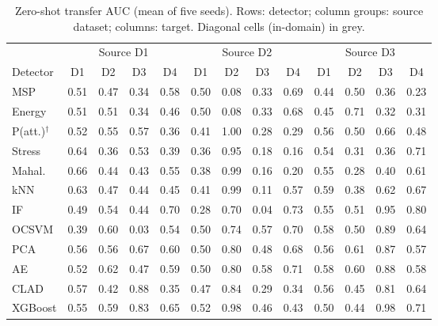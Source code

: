 \begin{table}[!t]
\centering
\scriptsize
\setlength{\tabcolsep}{3pt}
\caption{Zero-shot transfer AUC (mean of five seeds). Rows: detector; column groups: source dataset; columns: target. Diagonal cells (in-domain) in grey.}
\label{tab:a_transfer}
\begin{tabular}{lcccccccccccc}
\toprule
 & \multicolumn{4}{c}{Source D1} & \multicolumn{4}{c}{Source D2} & \multicolumn{4}{c}{Source D3}\\
\cmidrule(lr){2-5}\cmidrule(lr){6-9}\cmidrule(lr){10-13}
Detector & D1 & D2 & D3 & D4 & D1 & D2 & D3 & D4 & D1 & D2 & D3 & D4\\
\midrule
MSP & \cellcolor{black!10}0.51 & 0.47 & 0.34 & 0.58 & 0.50 & \cellcolor{black!10}0.08 & 0.33 & 0.69 & 0.44 & 0.50 & \cellcolor{black!10}0.36 & 0.23\\
Energy & \cellcolor{black!10}0.51 & 0.51 & 0.34 & 0.46 & 0.50 & \cellcolor{black!10}0.08 & 0.33 & 0.68 & 0.45 & 0.71 & \cellcolor{black!10}0.32 & 0.31\\
P(att.)$^\dagger$ & \cellcolor{black!10}0.52 & 0.55 & 0.57 & 0.36 & 0.41 & \cellcolor{black!10}1.00 & 0.28 & 0.29 & 0.56 & 0.50 & \cellcolor{black!10}0.66 & 0.48\\
Stress & \cellcolor{black!10}0.64 & 0.36 & 0.53 & 0.39 & 0.36 & \cellcolor{black!10}0.95 & 0.18 & 0.16 & 0.54 & 0.31 & \cellcolor{black!10}0.36 & 0.71\\
Mahal. & \cellcolor{black!10}0.66 & 0.44 & 0.43 & 0.55 & 0.38 & \cellcolor{black!10}0.99 & 0.16 & 0.20 & 0.55 & 0.28 & \cellcolor{black!10}0.40 & 0.61\\
kNN & \cellcolor{black!10}0.63 & 0.47 & 0.44 & 0.45 & 0.41 & \cellcolor{black!10}0.99 & 0.11 & 0.57 & 0.59 & 0.38 & \cellcolor{black!10}0.62 & 0.67\\
IF & \cellcolor{black!10}0.49 & 0.54 & 0.44 & 0.70 & 0.28 & \cellcolor{black!10}0.70 & 0.04 & 0.73 & 0.55 & 0.51 & \cellcolor{black!10}0.95 & 0.80\\
OCSVM & \cellcolor{black!10}0.39 & 0.60 & 0.03 & 0.54 & 0.50 & \cellcolor{black!10}0.74 & 0.57 & 0.70 & 0.58 & 0.50 & \cellcolor{black!10}0.89 & 0.64\\
PCA & \cellcolor{black!10}0.56 & 0.56 & 0.67 & 0.60 & 0.50 & \cellcolor{black!10}0.80 & 0.48 & 0.68 & 0.56 & 0.61 & \cellcolor{black!10}0.87 & 0.57\\
AE & \cellcolor{black!10}0.52 & 0.62 & 0.47 & 0.59 & 0.50 & \cellcolor{black!10}0.80 & 0.58 & 0.71 & 0.58 & 0.60 & \cellcolor{black!10}0.88 & 0.58\\
CLAD & \cellcolor{black!10}0.57 & 0.42 & 0.88 & 0.35 & 0.47 & \cellcolor{black!10}0.84 & 0.29 & 0.34 & 0.56 & 0.45 & \cellcolor{black!10}0.81 & 0.64\\
XGBoost & \cellcolor{black!10}0.55 & 0.59 & 0.83 & 0.65 & 0.52 & \cellcolor{black!10}0.98 & 0.46 & 0.43 & 0.50 & 0.44 & \cellcolor{black!10}0.98 & 0.71\\
\bottomrule
\end{tabular}
\end{table}